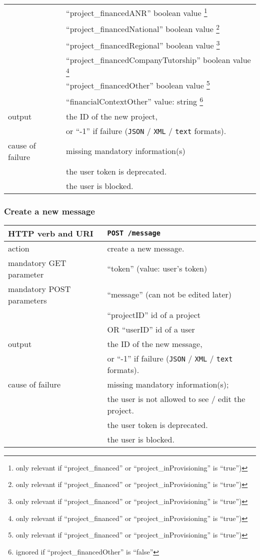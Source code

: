 \begin{tabular}{ | l | l | }
	\space & ``project\_financedANR'' boolean value \footnote{only relevant if ``project\_financed'' or ``project\_inProvisioning'' is ``true'')} \\
	\space & ``project\_financedNational'' boolean value \footnote{only relevant if ``project\_financed'' or ``project\_inProvisioning'' is ``true'')} \\
	\space & ``project\_financedRegional'' boolean value \footnote{only relevant if ``project\_financed'' or ``project\_inProvisioning'' is ``true'')} \\
	\space & ``project\_financedCompanyTutorship'' boolean value \footnote{only relevant if ``project\_financed'' or ``project\_inProvisioning'' is ``true'')} \\
	\space & ``project\_financedOther'' boolean value \footnote{only relevant if ``project\_financed'' or ``project\_inProvisioning'' is ``true'')} \\
	\space & ``financialContextOther'' value: string \footnote{ignored if ``project\_financedOther'' is ``false''} \\
	\hline
	output & the ID of the new project, \\
	\space & or ``-1'' if failure (\texttt{JSON} / \texttt{XML} / \texttt{text} formats). \\
	\hline
	cause of failure & missing mandatory information(s) \\
	\space & the user token is deprecated. \\
	\space & the user is blocked. \\
	\hline
\end{tabular}

\subsubsection{Create a new message}
\begin{tabular}{ | l | l | }
	\hline
	HTTP verb and URI & \texttt{POST /message} \\
	\hline
	action & create a new message. \\
	\hline
	mandatory GET parameter & ``token'' (value: user's token) \\
	\hline
	mandatory POST parameters & ``message'' (can not be edited later) \\
	\space & ``projectID'' id of a project \\		
	\space & OR ``userID'' id of a user \\
	\hline
	output & the ID of the new message, \\
	\space & or ``-1'' if failure (\texttt{JSON} / \texttt{XML} / \texttt{text} formats). \\
	\hline
	cause of failure & missing mandatory information(s); \\
	\space & the user is not allowed to see / edit the project. \\
	\space & the user token is deprecated. \\
	\space & the user is blocked. \\
	\hline
\end{tabular}


